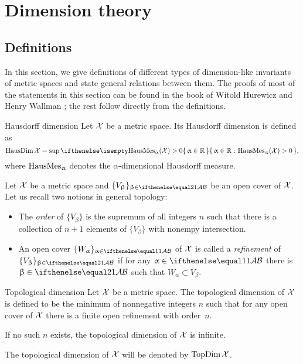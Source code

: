 \chapter{Dimension theory}\label{ch:dim}

\section{Definitions}\label{sec:prelim:dim}

In this section, we give definitions of different types of dimension-like invariants of metric spaces and state general relations between them.
The proofs of most of the statements in this section can be found in the book of Witold Hurewicz and Henry Wallman \cite{hurewicz-wallman}; 
the rest follow directly from the definitions.

\begin{thm}{Hausdorff dimension}
\label{def:HausDim}
Let $\mathcal{X}$ be a metric space. 
Its Hausdorff dimension is defined as
\[\HausDim\spc{X}=\sup\set{\alpha\in\RR}{\HausMes_\alpha(\spc{X})>0},\]
where $\mathop{\rm HausMes}\nolimits_\upalpha$ denotes the $\alpha$-dimensional Hausdorff measure.
\end{thm}

Let $\mathcal{X}$ be a metric space and $\{V_\beta\}_{\beta\in\IndexSet[2]}$
 be an open cover of $\mathcal{X}$.
Let us recall two notions in general topology:
\begin{itemize}

\item The \emph{order} of $\{V_\beta\}$ is the supremum of all integers $n$ such that there is a collection of $n+1$ elements of $\{V_\beta\}$ with nonempy intersection.

\item An open cover $\{W_\alpha\}_{\alpha\in\IndexSet}$ of $\mathcal{X}$ is called a \emph{refinement} of  $\{V_\beta\}_{\beta\in\IndexSet[2]}$ if for any $\alpha\in\IndexSet$ there is $\beta\in\IndexSet[2]$ such that $W_\alpha\subset V_\beta$.

\end{itemize}

\begin{thm}{Topological dimension}\label{def:TopDim}
Let $\mathcal{X}$ be a metric space. 
The topological dimension of $\mathcal{X}$ is defined to be the minimum of nonnegative integers $n$ 
such that for any open cover of $\mathcal{X}$ there is a finite open refinement with order~$n$.

If no such $n$ exists, the topological dimension of $\mathcal{X}$ is infinite.

The topological dimension of $\mathcal{X}$ will be denoted by $\mathop{\rm TopDim}\nolimits\mathcal{X}$.
\end{thm}

